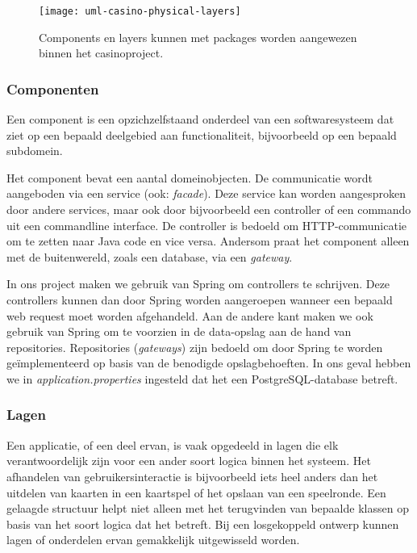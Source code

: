 \documentclass[dutch,a4paper,12pt,doubleside]{book}
\begin{document}
\begin{figure}[H]
    \centering
    \texttt{[image: uml-casino-physical-layers]}
    \caption{Components en layers kunnen met packages worden aangewezen binnen het casinoproject.}
    \label{fig:uml-casino-physical-layers}
\end{figure}

\subsubsection{Componenten}
Een component is een opzichzelfstaand onderdeel van een softwaresysteem
dat ziet op een bepaald deelgebied aan functionaliteit, bijvoorbeeld op een 
bepaald subdomein.

Het component bevat een aantal domeinobjecten. 
De communicatie wordt aangeboden via een service (ook: \textit{facade}). 
Deze service kan worden aangesproken door andere
services, maar ook door bijvoorbeeld een controller of een commando uit een commandline interface. 
De controller is bedoeld om HTTP-communicatie om te zetten naar Java code en vice versa. 
Andersom praat het component alleen met de buitenwereld, zoals een database, via een \textit{gateway}.

In ons project maken we gebruik van Spring om controllers te schrijven.
Deze controllers kunnen dan door Spring worden aangeroepen 
wanneer een bepaald web request moet worden afgehandeld.
Aan de andere kant maken we ook gebruik van Spring om te voorzien in 
de data-opslag aan de hand van repositories.
Repositories (\textit{gateways}) zijn bedoeld om door Spring 
te worden geïmplementeerd op basis van de benodigde opslagbehoeften.
In ons geval hebben we in \textit{application.properties} ingesteld dat het 
een PostgreSQL-database betreft.

\subsubsection{Lagen}
Een applicatie, of een deel ervan, is vaak opgedeeld in lagen die 
elk verantwoordelijk zijn voor een ander soort logica binnen het systeem.
Het afhandelen van gebruikersinteractie 
is bijvoorbeeld iets heel anders dan het uitdelen van kaarten in een
kaartspel of het opslaan van een speelronde.
Een gelaagde structuur helpt niet alleen met het terugvinden van
bepaalde klassen op basis van het soort logica dat het betreft. Bij een 
losgekoppeld ontwerp kunnen lagen of onderdelen ervan gemakkelijk uitgewisseld worden.
\end{document}

